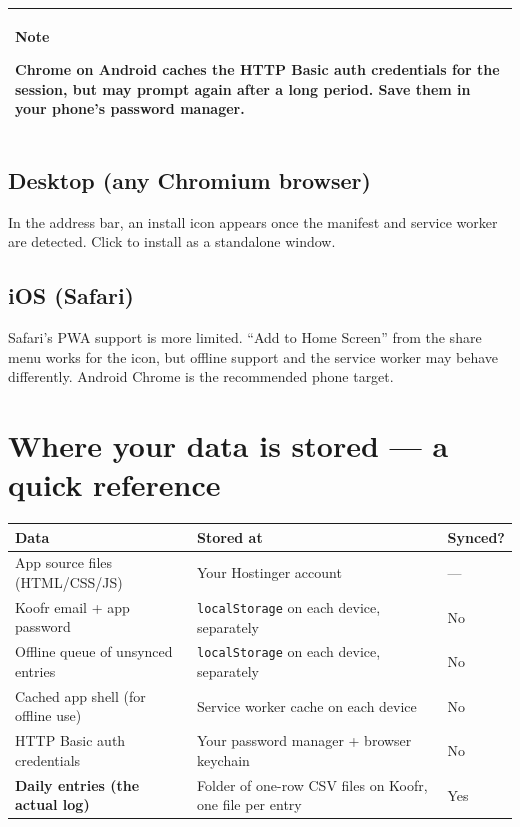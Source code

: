 \documentclass[11pt,a4paper]{article}
\newcommand{\callout}[3]{%
  \begin{center}%
  \begin{tabularx}{\linewidth}{|>{\columncolor{#1}}X|}%
  \hline
  \textbf{#2}\par\smallskip #3\\[2pt]
  \hline
  \end{tabularx}%
  \end{center}%
}
\newcommand{\notebox}[1]{\callout{notebg}{Note}{#1}}
\begin{document}
\notebox{Chrome on Android caches the HTTP Basic auth credentials for the session, but may prompt again after a long period. Save them in your phone's password manager.}

\subsection{Desktop (any Chromium browser)}

In the address bar, an install icon appears once the manifest and service worker are detected. Click to install as a standalone window.

\subsection{iOS (Safari)}

Safari's PWA support is more limited. ``Add to Home Screen'' from the share menu works for the icon, but offline support and the service worker may behave differently. Android Chrome is the recommended phone target.

\section{Where your data is stored --- a quick reference}

\begin{center}
\small
\renewcommand{\arraystretch}{1.3}
\begin{tabularx}{\linewidth}{l X l}
\textbf{Data} & \textbf{Stored at} & \textbf{Synced?} \\ \hline
App source files (HTML/CSS/JS) & Your Hostinger account & --- \\
Koofr email + app password & \texttt{localStorage} on each device, separately & No \\
Offline queue of unsynced entries & \texttt{localStorage} on each device, separately & No \\
Cached app shell (for offline use) & Service worker cache on each device & No \\
HTTP Basic auth credentials & Your password manager + browser keychain & No \\
\textbf{Daily entries (the actual log)} & Folder of one-row CSV files on Koofr, one file per entry & Yes \\
\end{tabularx}
\end{center}
\end{document}
